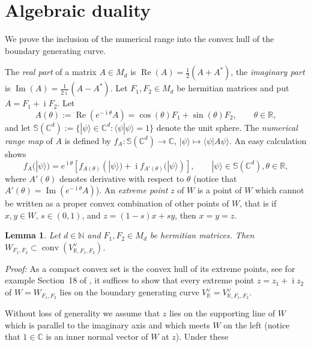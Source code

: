 \documentclass[12pt]{amsart}
\newtheorem{lem}[thm]{Lemma}
\theoremstyle{definition}
\numberwithin{equation}{section}
\begin{document}
\section{Algebraic duality}
\label{sec:alg_duality}
\par
We prove the inclusion of the numerical range into the convex hull 
of the boundary generating curve.
\par
The {\em real part} of a matrix $A\in M_d$ is ${\operatorname{Re}}(A)=\tfrac{1}{2}(A+A^*)$,
the {\em imaginary part} is ${\operatorname{Im}}(A)=\tfrac{1}{2{\operatorname{i}}}(A-A^*)$. Let 
$F_1,F_2\in M_d$ be hermitian matrices and put $A=F_1+{\operatorname{i}} F_2$. Let
\[
A(\theta):={\operatorname{Re}}(e^{-{\operatorname{i}}\theta}A)
=\cos(\theta)F_1+\sin(\theta)F_2,
\qquad
\theta\in{\mathbb R},
\]
and let ${\mathbb S}({\mathbb C}^d):=\{|\psi\rangle\in{\mathbb C}^d : \langle\psi|\psi\rangle=1 \}$ 
denote the unit sphere. The {\em numerical range map} of $A$ is defined by
$f_A:{\mathbb S}({\mathbb C}^d)\to{\mathbb C}$,
$|\psi\rangle \mapsto \langle \psi|A\psi\rangle$.
An easy calculation shows 
\begin{equation}\label{eq:NR-map}
f_A(|\psi\rangle)
=e^{{\operatorname{i}}\theta}[f_{A(\theta)}(|\psi\rangle)+{\operatorname{i}} f_{A'(\theta)}(|\psi\rangle)],
\qquad
|\psi\rangle\in {\mathbb S}({\mathbb C}^d), \theta\in{\mathbb R},
\end{equation}
where $A'(\theta)$ denotes derivative with respect to $\theta$
(notice that $A'(\theta)={\operatorname{Im}}(e^{-{\operatorname{i}}\theta}A)$). An {\em extreme point} $z$ 
of $W$ is a point of $W$ which cannot be written as a proper convex 
combination of other points of $W$, that is if $x,y\in W$, $s\in(0,1)$, and 
$z=(1-s)x+s y$, then $x=y=z$.
\begin{lem}\label{lem:ext-on-curve}
Let $d\in{\mathbb N}$ and $F_1,F_2\in M_d$ be hermitian matrices. 
Then $W_{F_1,F_2}\subset{\operatorname{conv}}(V^\vee_{{\mathbb R},F_1,F_2})$.
\end{lem}
{\em Proof:} 
As a compact convex set is the convex hull of its extreme points, see for example 
Section~18 of \cite{Rockafellar1970}, it suffices to show that every extreme point 
$z=z_1+{\operatorname{i}} z_2$ of $W=W_{F_1,F_2}$ lies on the boundary generating curve 
$V^\vee_{\mathbb R}=V^\vee_{{\mathbb R},F_1,F_2}$. 
\par
Without loss of generality we assume that $z$ lies on the supporting line of 
$W$  which is parallel to the imaginary axis and which meets $W$ on the left
(notice that $1\in{\mathbb C}$ is an inner normal vector of $W$ at $z$). Under these 
\end{document}
